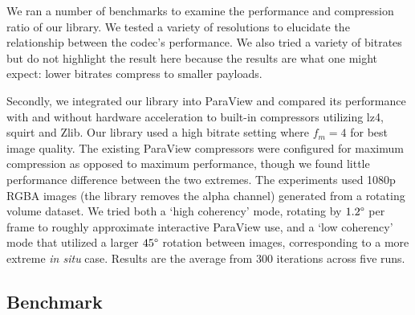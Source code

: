 \documentclass[review]{vgtc}                 %
\begin{document}
We ran a number of benchmarks to examine the performance and
compression ratio of our library. We tested a variety of resolutions to
elucidate the relationship between the codec's performance.  We also
tried a variety of bitrates but do not highlight the result here
because the results are what one might expect: lower bitrates compress
to smaller payloads.


Secondly, we integrated our library into ParaView and compared its
performance with and without hardware acceleration to
built-in compressors utilizing lz4, squirt and Zlib. Our library used a high
bitrate setting where \(f_m=4\) for best image quality. The existing
ParaView compressors were configured for maximum compression as opposed
to maximum performance, though we found little performance difference
between the two extremes.  The experiments used 1080p RGBA images (the
library removes the alpha channel) generated from a rotating volume
dataset.  We tried both a `high coherency' mode, rotating by
$1.2\degree{}$ per frame to roughly approximate interactive ParaView
use, and a `low coherency' mode that utilized a larger $45\degree{}$
rotation between
images, corresponding to a more extreme \textit{in situ} case.  Results
are the average from 300 iterations across five runs.


\subsection{Benchmark}
\end{document}
